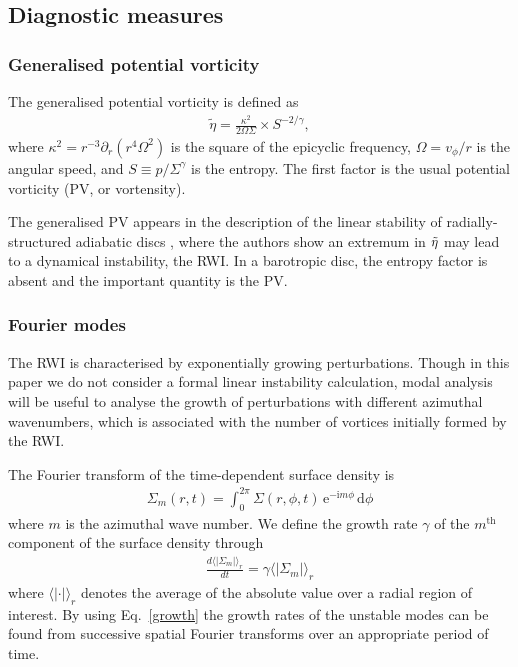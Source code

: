 \subsection{Diagnostic measures}

\subsubsection{Generalised potential vorticity}

The generalised potential vorticity is defined as
\begin{align}
  \tilde{\eta} = \frac{\kappa^2}{2\Omega\Sigma}\times S^{-2/\gamma}, 
\end{align}
where $\kappa^2 = r^{-3}\partial_r(r^4\Omega^2)$ is the square of the
epicyclic frequency, $\Omega=v_\phi/r$ is the angular speed, and
$S\equiv p/\Sigma^\gamma$ is the entropy. The first factor is the
usual potential vorticity (PV, or vortensity). 

The generalised PV appears in the description of the linear stability
of radially-structured adiabatic discs \citep{lovelace99,li00}, where
the authors show an extremum in $\tilde{\eta}$ may lead to a dynamical
instability, the RWI. In a barotropic disc, the entropy factor is
absent and the important quantity is the PV. 

\subsubsection{Fourier modes} 
The RWI is characterised by exponentially
growing perturbations. Though in this paper we do not consider a
formal linear instability calculation, modal analysis will be useful
to analyse the growth of perturbations with different azimuthal
wavenumbers, which is associated with the number of vortices initially
formed by the RWI.    

The Fourier transform of the time-dependent surface density is
\begin{align}\label{fouriertransform}
  \Sigma_m(r,t) = \int_{0}^{2\pi}
  \Sigma(r,\phi,t) \, \mathrm{e}^{-\mathrm{i}m\phi} \, \mathrm{d}\phi 
\end{align} 
where $m$ is the azimuthal wave number. We define the growth rate
$\gamma$ of the $m^\mathrm{th}$ component of the surface density
through 
\begin{align}\label{growth}
  \frac{d \langle|\Sigma_m|\rangle_r }{dt}= \gamma \langle|\Sigma_m|\rangle_r 
\end{align}
where %
$\langle|\cdot|\rangle_r$ denotes the average of the absolute value
over a radial region of interest. By using Eq.~\ref{growth} the growth
rates of the unstable modes can be found from successive spatial
Fourier transforms over an appropriate period of time. 

